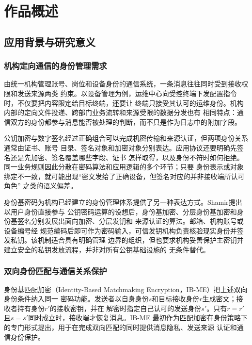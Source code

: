 \chapter{作品概述}

\section{应用背景与研究意义}

\subsection{机构定向通信的身份管理需求}

由统一机构管理账号、岗位和设备身份的通信系统，一条消息往往同时受到接收权限和发送来源两类
约束。以设备管理为例，运维中心向受控终端下发配置指令时，不仅要把内容限定给目标终端，还要让
终端只接受其认可的运维身份。机构内部的定向文件投递、跨部门业务流转和来源受限的数据分发也有
相同特点：通信双方的身份都参与消息能否被处理的判断，而不只是作为日志中的附加字段。

公钥加密与数字签名经过正确组合可以完成机密传输和来源认证，但两项身份关系通常由证书、账号
目录、签名对象和加密对象分别表达。应用协议还要明确先签名还是先加密、签名覆盖哪些字段、证书
怎样取得，以及身份不符时如何拒绝。同一业务规则因此分散在密码算法和应用逻辑的多个环节；只要
身份表示或对象绑定不一致，就可能出现“密文发给了正确设备，但签名对应的并非接收端所认可角色”
之类的语义偏差。

身份基密码为机构已经建立的身份管理体系提供了另一种表达方式。Shamir提出以用户身份直接参与
公钥密码运算的设想后，身份基加密、分层身份基加密和身份基签名分别发展出面向加密、分层发钥和
来源认证的算法\cite{shamir1984,gentrysilverberg2002,hess2003ibs}。邮箱、机构账号或设备编号经
规范编码后即可作为密码输入，可信发钥机构负责核验现实身份并签发私钥。该机制适合具有明确管理
边界的组织，但也要求机构妥善保护主密钥并建立安全的私钥发放流程，并非对所有公钥基础设施的
无条件替代。

\subsection{双向身份匹配与通信关系保护}

身份基匹配加密（Identity-Based Matchmaking Encryption，IB-ME）把上述双向身份条件纳入同一
密码功能。发送者以自身身份$s$和目标接收身份$r$生成密文；接收者持有身份$r'$的接收密钥，并在
解密时指定自己认可的发送身份$s'$。只有$r=r'$且$s=s'$同时成立时，接收端才恢复消息。IB-ME
最初作为匹配加密在身份策略下的专门形式提出，用于在完成双向匹配的同时提供消息隐私、发送来源
认证和通信身份保护\cite{ateniese2019me}。

